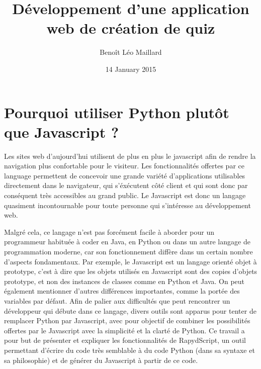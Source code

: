 \documentclass[letterpaper,10pt,french]{sphinxmanual}
\title{Développement d'une application web de création de quiz}
\date{14 January 2015}
\author{Benoît Léo Maillard}
\begin{document}
\maketitle
\tableofcontents
{}\label{index::doc}



\chapter{Pourquoi utiliser Python plutôt que Javascript ?}
\label{rapydscript:pourquoi-utiliser-python-plutot-que-javascript}\label{rapydscript:presentation-de-rapydscript}\label{rapydscript::doc}
Les sites web d'aujourd'hui utilisent de plus en plus le javascript afin de rendre la navigation plus confortable pour le visiteur. Les fonctionnalités offertes par ce language permettent de concevoir une grande variété d'applications utilisables directement dans le navigateur, qui s'éxécutent côté client et qui sont donc par conséquent très accessibles au grand public. Le Javascript est donc un langage quasiment incontournable pour toute personne qui s'intéresse au développement web.

Malgré cela, ce langage n'est pas forcément facile à aborder pour un programmeur habituée à coder en Java, en Python ou dans un autre langage de programmation moderne, car son fonctionnement diffère dans un certain nombre d'aspects fondamentaux. Par exemple, le Javascript est un langage orienté objet à prototype, c'est à dire que les objets utilisés en Javascript sont des copies d'objets prototype, et non des instances de classes comme en Python et Java. On peut également mentionner d'autres différences importantes, comme la portée des variables par défaut. Afin de palier aux difficultés que peut rencontrer un développeur qui débute dans ce langage, divers outils sont apparus pour tenter de remplacer Python par Javascript, avec pour objectif de combiner les possibilités offertes par le Javascript avec la simplicité et la clarté de Python. Ce travail a pour but de présenter et expliquer les fonctionnalités de RapydScript, un outil permettant d'écrire du code très semblable à du code Python (dans sa syntaxe et sa philosophie) et de générer du Javascript à partir de ce code.
\end{document}
